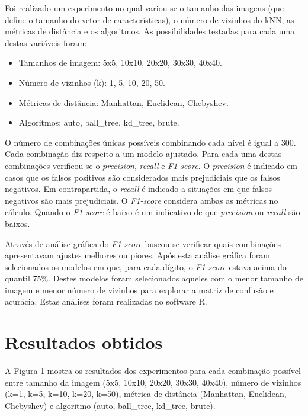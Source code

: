 \documentclass[
	12pt,				%
	openright,			%
	twoside,			%
	a4paper,			%
	english,			%
	brazil,				%
	svgnames
	]{abntex2}\usepackage[]{graphicx}\usepackage[]{color}
\begin{document}
Foi realizado um experimento no qual variou-se o tamanho das imagens (que define o tamanho do vetor de características), o número de vizinhos do kNN, as métricas de distância e os algoritmos. As possibilidades testadas para cada uma destas variáveis foram:

\begin{itemize}
  \itemsep 0.5ex
  \item Tamanhos de imagem: 5x5, 10x10, 20x20, 30x30, 40x40.
  \item Número de vizinhos (k): 1, 5, 10, 20, 50.
  \item Métricas de distância: Manhattan, Euclidean, Chebyshev.
  \item Algoritmos: auto, ball\_tree, kd\_tree, brute.
\end{itemize}

O número de combinações únicas possíveis combinando cada nível é igual a 300. Cada combinação diz respeito a um modelo ajustado. Para cada uma destas combinações verificou-se o \emph{precision}, \emph{recall} e \emph{F1-score}. O \emph{precision} é indicado em casos que os falsos positivos são considerados mais prejudiciais que os falsos negativos. Em contrapartida, o \emph{recall} é indicado a situações em que falsos negativos são mais prejudiciais. O \emph{F1-score} considera ambas as métricas no cálculo. Quando o \emph{F1-score} é baixo é um indicativo de que \emph{precision} ou \emph{recall} são baixos.

Através de análise gráfica do \emph{F1-score} buscou-se verificar quais combinações apresentavam ajustes melhores ou piores. Após esta análise gráfica foram selecionados os modelos em que, para cada dígito, o \emph{F1-score} estava acima do quantil 75\%. Destes modelos foram selecionados aqueles com o menor tamanho de imagem e menor número de vizinhos para explorar a matriz de confusão e acurácia. Estas análises foram realizadas no software R.


\chapter{Resultados obtidos}
\label{cap:resultados}


A Figura 1 mostra os resultados dos experimentos para cada combinação possível entre tamanho da imagem (5x5, 10x10, 20x20, 30x30, 40x40), número de vizinhos (k=1, k=5, k=10, k=20, k=50), métrica de distância (Manhattan, Euclidean, Chebyshev) e algoritmo (auto, ball\_tree, kd\_tree, brute).
\end{document}
